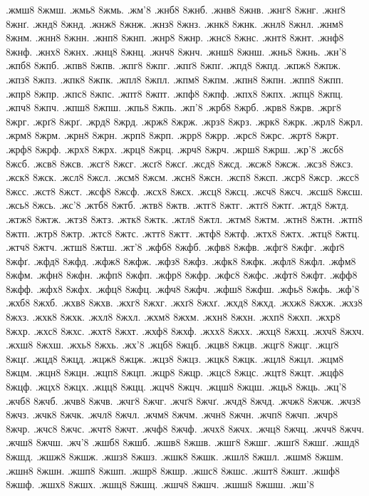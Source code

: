 {.жмш8 8жмш.
.жмь8 8жмь.
.жм'8
.жнб8 8жнб.
.жнв8 8жнв.
.жнг8 8жнг.
.жнґ8 8жнґ.
.жнд8 8жнд.
.жнж8 8жнж.
.жнз8 8жнз.
.жнк8 8жнк.
.жнл8 8жнл.
.жнм8 8жнм.
.жнн8 8жнн.
.жнп8 8жнп.
.жнр8 8жнр.
.жнс8 8жнс.
.жнт8 8жнт.
.жнф8 8жнф.
.жнх8 8жнх.
.жнц8 8жнц.
.жнч8 8жнч.
.жнш8 8жнш.
.жнь8 8жнь.
.жн'8
.жпб8 8жпб.
.жпв8 8жпв.
.жпг8 8жпг.
.жпґ8 8жпґ.
.жпд8 8жпд.
.жпж8 8жпж.
.жпз8 8жпз.
.жпк8 8жпк.
.жпл8 8жпл.
.жпм8 8жпм.
.жпн8 8жпн.
.жпп8 8жпп.
.жпр8 8жпр.
.жпс8 8жпс.
.жпт8 8жпт.
.жпф8 8жпф.
.жпх8 8жпх.
.жпц8 8жпц.
.жпч8 8жпч.
.жпш8 8жпш.
.жпь8 8жпь.
.жп'8
.жрб8 8жрб.
.жрв8 8жрв.
.жрг8 8жрг.
.жрґ8 8жрґ.
.жрд8 8жрд.
.жрж8 8жрж.
.жрз8 8жрз.
.жрк8 8жрк.
.жрл8 8жрл.
.жрм8 8жрм.
.жрн8 8жрн.
.жрп8 8жрп.
.жрр8 8жрр.
.жрс8 8жрс.
.жрт8 8жрт.
.жрф8 8жрф.
.жрх8 8жрх.
.жрц8 8жрц.
.жрч8 8жрч.
.жрш8 8жрш.
.жр'8
.жсб8 8жсб.
.жсв8 8жсв.
.жсг8 8жсг.
.жсґ8 8жсґ.
.жсд8 8жсд.
.жсж8 8жсж.
.жсз8 8жсз.
.жск8 8жск.
.жсл8 8жсл.
.жсм8 8жсм.
.жсн8 8жсн.
.жсп8 8жсп.
.жср8 8жср.
.жсс8 8жсс.
.жст8 8жст.
.жсф8 8жсф.
.жсх8 8жсх.
.жсц8 8жсц.
.жсч8 8жсч.
.жсш8 8жсш.
.жсь8 8жсь.
.жс'8
.жтб8 8жтб.
.жтв8 8жтв.
.жтг8 8жтг.
.жтґ8 8жтґ.
.жтд8 8жтд.
.жтж8 8жтж.
.жтз8 8жтз.
.жтк8 8жтк.
.жтл8 8жтл.
.жтм8 8жтм.
.жтн8 8жтн.
.жтп8 8жтп.
.жтр8 8жтр.
.жтс8 8жтс.
.жтт8 8жтт.
.жтф8 8жтф.
.жтх8 8жтх.
.жтц8 8жтц.
.жтч8 8жтч.
.жтш8 8жтш.
.жт'8
.жфб8 8жфб.
.жфв8 8жфв.
.жфг8 8жфг.
.жфґ8 8жфґ.
.жфд8 8жфд.
.жфж8 8жфж.
.жфз8 8жфз.
.жфк8 8жфк.
.жфл8 8жфл.
.жфм8 8жфм.
.жфн8 8жфн.
.жфп8 8жфп.
.жфр8 8жфр.
.жфс8 8жфс.
.жфт8 8жфт.
.жфф8 8жфф.
.жфх8 8жфх.
.жфц8 8жфц.
.жфч8 8жфч.
.жфш8 8жфш.
.жфь8 8жфь.
.жф'8
.жхб8 8жхб.
.жхв8 8жхв.
.жхг8 8жхг.
.жхґ8 8жхґ.
.жхд8 8жхд.
.жхж8 8жхж.
.жхз8 8жхз.
.жхк8 8жхк.
.жхл8 8жхл.
.жхм8 8жхм.
.жхн8 8жхн.
.жхп8 8жхп.
.жхр8 8жхр.
.жхс8 8жхс.
.жхт8 8жхт.
.жхф8 8жхф.
.жхх8 8жхх.
.жхц8 8жхц.
.жхч8 8жхч.
.жхш8 8жхш.
.жхь8 8жхь.
.жх'8
.жцб8 8жцб.
.жцв8 8жцв.
.жцг8 8жцг.
.жцґ8 8жцґ.
.жцд8 8жцд.
.жцж8 8жцж.
.жцз8 8жцз.
.жцк8 8жцк.
.жцл8 8жцл.
.жцм8 8жцм.
.жцн8 8жцн.
.жцп8 8жцп.
.жцр8 8жцр.
.жцс8 8жцс.
.жцт8 8жцт.
.жцф8 8жцф.
.жцх8 8жцх.
.жцц8 8жцц.
.жцч8 8жцч.
.жцш8 8жцш.
.жць8 8жць.
.жц'8
.жчб8 8жчб.
.жчв8 8жчв.
.жчг8 8жчг.
.жчґ8 8жчґ.
.жчд8 8жчд.
.жчж8 8жчж.
.жчз8 8жчз.
.жчк8 8жчк.
.жчл8 8жчл.
.жчм8 8жчм.
.жчн8 8жчн.
.жчп8 8жчп.
.жчр8 8жчр.
.жчс8 8жчс.
.жчт8 8жчт.
.жчф8 8жчф.
.жчх8 8жчх.
.жчц8 8жчц.
.жчч8 8жчч.
.жчш8 8жчш.
.жч'8
.жшб8 8жшб.
.жшв8 8жшв.
.жшг8 8жшг.
.жшґ8 8жшґ.
.жшд8 8жшд.
.жшж8 8жшж.
.жшз8 8жшз.
.жшк8 8жшк.
.жшл8 8жшл.
.жшм8 8жшм.
.жшн8 8жшн.
.жшп8 8жшп.
.жшр8 8жшр.
.жшс8 8жшс.
.жшт8 8жшт.
.жшф8 8жшф.
.жшх8 8жшх.
.жшц8 8жшц.
.жшч8 8жшч.
.жшш8 8жшш.
.жш'8
}
